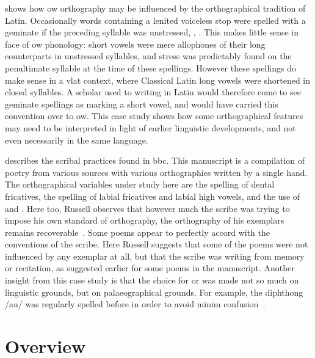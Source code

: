 \Textcite{Sch_Geminatespellings01} shows how \gls{ow} orthography may be influenced by the orthographical tradition of Latin. Occasionally words containing a lenited voiceless stop were spelled with a geminate if the preceding syllable was unstressed, \eg {}, . This makes little sense in face of \gls{ow} phonology: short vowels were mere allophones of their long counterparts in unstressed syllables, and stress was predictably found on the penultimate syllable at the time of these spellings. However these spellings do make sense in a \gls{vlat} context, where  Classical Latin long vowels were shortened in closed syllables. A scholar used to writing in Latin would therefore come to see geminate spellings as marking a short vowel, and would have carried this convention over to \gls{ow}. This case study shows how some orthographical features may need to be interpreted in light of earlier linguistic developments, and not even necessarily in the same language. 

\Textcite{Rus_Scribalconsistency09} describes the scribal practices found in \gls{bbc}. This manuscript is a compilation of poetry from various sources with various orthographies written by a single hand. The orthographical variables under study here are the spelling of dental fricatives, the spelling of labial fricatives and labial high vowels, and the use of  and . Here too, Russell observes that however much the scribe was trying to impose his own standard of orthography, the orthography of his exemplars remains recoverable~\autocite*[168]{Rus_Scribalconsistency09}. Some poems appear to perfectly accord with the conventions of the scribe. Here Russell suggests that some of the poems were not influenced by any exemplar at all, but that the scribe was writing from memory or recitation, as suggested earlier for some poems in the manuscript. Another insight from this case study is that the choice for  or  was made not so much on linguistic grounds, but on palaeographical grounds. For example, the diphthong /au/ was regularly spelled  before  in order to avoid minim confusion~\autocite{Rus_Scribalconsistency09}. %

\section{Overview}
\label{sec:overview}

